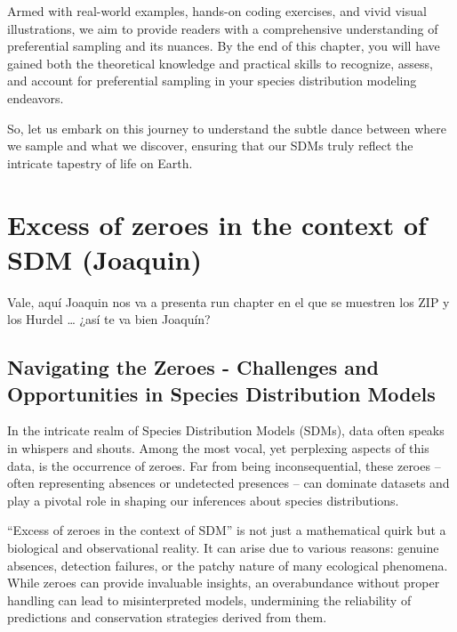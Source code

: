 \documentclass[
]{krantz}
\begin{document}
Armed with real-world examples, hands-on coding exercises, and vivid visual illustrations, we aim to provide readers with a comprehensive understanding of preferential sampling and its nuances. By the end of this chapter, you will have gained both the theoretical knowledge and practical skills to recognize, assess, and account for preferential sampling in your species distribution modeling endeavors.

So, let us embark on this journey to understand the subtle dance between where we sample and what we discover, ensuring that our SDMs truly reflect the intricate tapestry of life on Earth.

\pagebreak
\setcounter{chapter}{7}
\setcounter{section}{0}
\renewcommand{\thepage}{\arabic{page}}

\hypertarget{excess-of-zeroes-in-the-context-of-sdm-joaquin}{%
\chapter{Excess of zeroes in the context of SDM (Joaquin)}\label{excess-of-zeroes-in-the-context-of-sdm-joaquin}}

Vale, aquí Joaquin nos va a presenta run chapter en el que se muestren los ZIP y los Hurdel \ldots{} ¿así te va bien Joaquín?

\hypertarget{navigating-the-zeroes---challenges-and-opportunities-in-species-distribution-models}{%
\section{Navigating the Zeroes - Challenges and Opportunities in Species Distribution Models}\label{navigating-the-zeroes---challenges-and-opportunities-in-species-distribution-models}}

In the intricate realm of Species Distribution Models (SDMs), data often speaks in whispers and shouts. Among the most vocal, yet perplexing aspects of this data, is the occurrence of zeroes. Far from being inconsequential, these zeroes -- often representing absences or undetected presences -- can dominate datasets and play a pivotal role in shaping our inferences about species distributions.

``Excess of zeroes in the context of SDM'' is not just a mathematical quirk but a biological and observational reality. It can arise due to various reasons: genuine absences, detection failures, or the patchy nature of many ecological phenomena. While zeroes can provide invaluable insights, an overabundance without proper handling can lead to misinterpreted models, undermining the reliability of predictions and conservation strategies derived from them.
\end{document}

